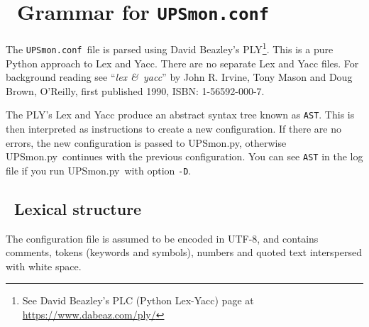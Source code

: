 \documentclass[12pt]{article}
\newlength{\headersep}\setlength{\headersep}{3mm}
\newcommand{\Hsep}{\hspace{\headersep}}
\newcommand{\UPSmon}{\mbox{\textcolor{UPSMONCOLOUR}{UPSmon.py}}}
\newcommand{\UPSmonconf}{\textcolor{UPSMONCOLOUR}{\texttt{UPSmon.conf}}}
\newcommand{\PLY}{David Beazley's PLY\footnote{See David Beazley's PLC (Python Lex-Yacc) page at
                  \href{https://www.dabeaz.com/ply/}%
                       {https://{\allowbreak}www.dabeaz.com/{\allowbreak}ply/}}}
\begin{document}
\section{\Hsep\ Grammar for \UPSmonconf}\label{section:grammar}

The \UPSmonconf\ file is parsed using \PLY. This is a pure Python approach to
Lex and Yacc.  There are no separate Lex and Yacc files.  For background
reading see ``\textit{lex \&\ yacc}'' by John R. Irvine, Tony Mason and Doug
Brown, O'Reilly, first published 1990, ISBN: 1-56592-000-7.

The PLY's Lex and Yacc produce an abstract syntax tree known as \texttt{AST}.
This is then interpreted as instructions to create a new configuration.  If
there are no errors, the new configuration is passed to \UPSmon, otherwise
\UPSmon\ continues with the previous configuration.  You can see \texttt{AST}
in the log file if you run \UPSmon\ with option \texttt{-D}.

\subsection{\Hsep\ Lexical structure}\label{section:lexstruct}

The configuration file is assumed to be encoded in UTF-8, and contains
comments, tokens (keywords and symbols), numbers and quoted text interspersed
with white space.
\end{document}
